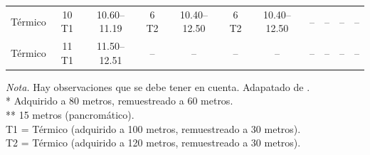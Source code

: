 \begin{table}[H]
\begin{spacing}{8}
\begin{tabularx}{\linewidth}{P{3cm}*{10}{c}}
                                Térmico & 10 T1 & 10.60–11.19 & 6 T2 & 10.40–12.50 & 6 T2 & 10.40–12.50 & -- & -- & -- & -- \\
                                Térmico & 11 T1 & 11.50–12.51 & -- & -- & -- & -- & -- & -- & -- & -- \\
                                \bottomrule
                            \end{tabularx}
                        \end{spacing}
                        \vspace{1\baselineskip}
                        \textit{Nota.} Hay observaciones que se debe tener en cuenta. Adapatado de \textcite{Landsat2023}. \\
                            * Adquirido a 80 metros, remuestreado a 60 metros. \\
                            ** 15 metros (pancromático). \\
                            T1 = Térmico (adquirido a 100 metros, remuestreado a 30 metros). \\
                            T2 = Térmico (adquirido a 120 metros, remuestreado a 30 metros). 
                        \label{BandasLandsat}
                    \end{table}
                
